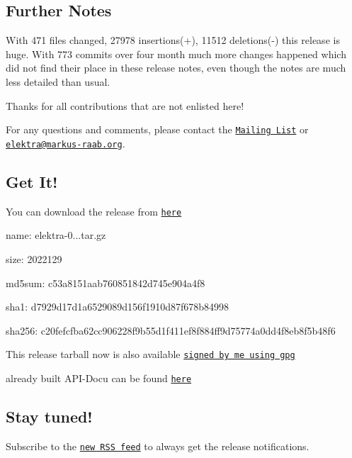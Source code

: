 \subsection*{Further Notes}

With 471 files changed, 27978 insertions(+), 11512 deletions(-\/) this release is huge. With 773 commits over four month much more changes happened which did not find their place in these release notes, even though the notes are much less detailed than usual.

Thanks for all contributions that are not enlisted here!

For any questions and comments, please contact the \href{https://lists.sourceforge.net/lists/listinfo/registry-list}{\tt Mailing List} or \href{mailto:elektra@markus-raab.org}{\tt elektra@markus-\/raab.\+org}.

\subsection*{Get It!}

You can download the release from \href{http://www.markus-raab.org/ftp/elektra/releases/elektra-0.8.11.tar.gz}{\tt here}


\begin{DoxyItemize}
\item name\+: elektra-\/0...\+tar.\+gz
\item size\+: 2022129
\item md5sum\+: c53a8151aab760851842d745e904a4f8
\item sha1\+: d7929d17d1a6529089d156f1910d87f678b84998
\item sha256\+: c20fefcfba62cc906228f9b55d1f411ef8f884ff9d75774a0dd4f8eb8f5b48f6
\end{DoxyItemize}

This release tarball now is also available \href{http://www.markus-raab.org/ftp/elektra/releases/elektra-0.8.11.tar.gz.gpg}{\tt signed by me using gpg}

already built A\+P\+I-\/\+Docu can be found \href{http://doc.libelektra.org/api/0.8.11/html/}{\tt here}

\subsection*{Stay tuned!}

Subscribe to the \href{http://doc.libelektra.org/news/feed.rss}{\tt new R\+S\+S feed} to always get the release notifications.

